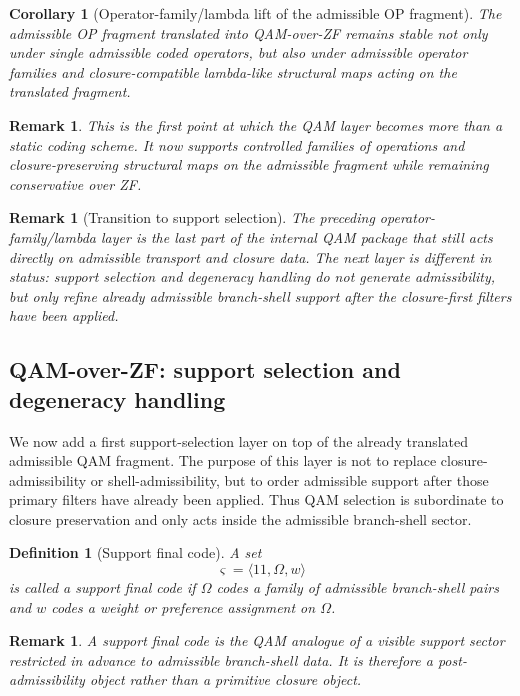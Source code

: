 \documentclass[12pt,a4paper]{article}
\newtheorem{corollary}[theorem]{Corollary}
\newtheorem{definition}[theorem]{Definition}
\newtheorem{remark}[theorem]{Remark}
\begin{document}
\begin{corollary}[Operator-family/lambda lift of the admissible OP fragment]
The admissible OP fragment translated into QAM-over-ZF remains stable not only under single admissible coded operators, but also under admissible operator families and closure-compatible lambda-like structural maps acting on the translated fragment.
\end{corollary}

\begin{remark}
This is the first point at which the QAM layer becomes more than a static coding scheme. It now supports controlled families of operations and closure-preserving structural maps on the admissible fragment while remaining conservative over ZF.
\end{remark}

\begin{remark}[Transition to support selection]
The preceding operator-family/lambda layer is the last part of the internal QAM package that still acts directly on admissible transport and closure data. The next layer is different in status: support selection and degeneracy handling do not generate admissibility, but only refine already admissible branch-shell support after the closure-first filters have been applied.
\end{remark}

\subsection{QAM-over-ZF: support selection and degeneracy handling}

We now add a first support-selection layer on top of the already translated admissible QAM fragment. The purpose of this layer is not to replace closure-admissibility or shell-admissibility, but to order admissible support after those primary filters have already been applied. Thus QAM selection is subordinate to closure preservation and only acts inside the admissible branch-shell sector.

\begin{definition}[Support final code]
A set
\[
\varsigma = \langle 11,\Omega,w\rangle
\]
is called a \emph{support final code} if $\Omega$ codes a family of admissible branch-shell pairs and $w$ codes a weight or preference assignment on $\Omega$.
\end{definition}

\begin{remark}
A support final code is the QAM analogue of a visible support sector restricted in advance to admissible branch-shell data. It is therefore a post-admissibility object rather than a primitive closure object.
\end{remark}
\end{document}
